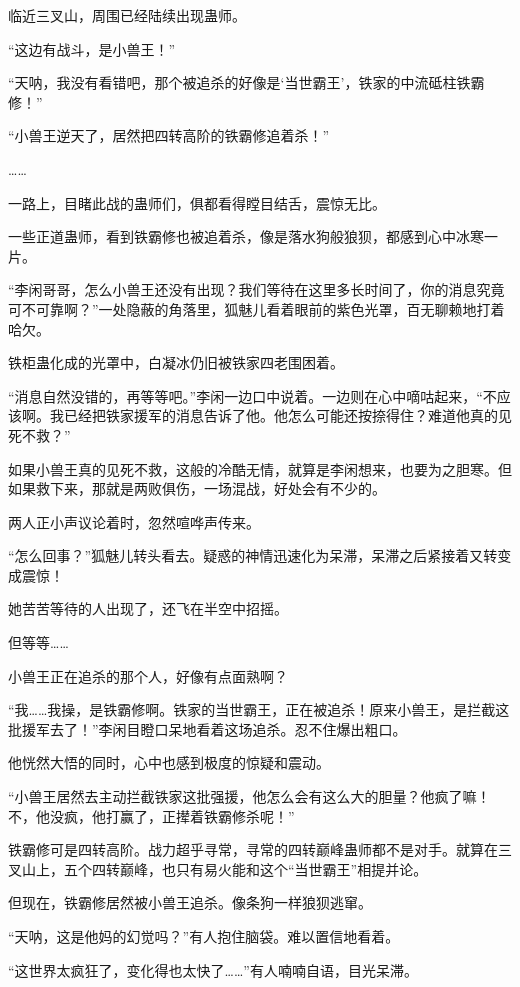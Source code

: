 \begin{this_body}
临近三叉山，周围已经陆续出现蛊师。

“这边有战斗，是小兽王！”

“天呐，我没有看错吧，那个被追杀的好像是‘当世霸王’，铁家的中流砥柱铁霸修！”

“小兽王逆天了，居然把四转高阶的铁霸修追着杀！”

……

一路上，目睹此战的蛊师们，俱都看得瞠目结舌，震惊无比。

一些正道蛊师，看到铁霸修也被追着杀，像是落水狗般狼狈，都感到心中冰寒一片。

“李闲哥哥，怎么小兽王还没有出现？我们等待在这里多长时间了，你的消息究竟可不可靠啊？”一处隐蔽的角落里，狐魅儿看着眼前的紫色光罩，百无聊赖地打着哈欠。

铁柜蛊化成的光罩中，白凝冰仍旧被铁家四老围困着。

“消息自然没错的，再等等吧。”李闲一边口中说着。一边则在心中嘀咕起来，“不应该啊。我已经把铁家援军的消息告诉了他。他怎么可能还按捺得住？难道他真的见死不救？”

如果小兽王真的见死不救，这般的冷酷无情，就算是李闲想来，也要为之胆寒。但如果救下来，那就是两败俱伤，一场混战，好处会有不少的。

两人正小声议论着时，忽然喧哗声传来。

“怎么回事？”狐魅儿转头看去。疑惑的神情迅速化为呆滞，呆滞之后紧接着又转变成震惊！

她苦苦等待的人出现了，还飞在半空中招摇。

但等等……

小兽王正在追杀的那个人，好像有点面熟啊？

“我……我操，是铁霸修啊。铁家的当世霸王，正在被追杀！原来小兽王，是拦截这批援军去了！”李闲目瞪口呆地看着这场追杀。忍不住爆出粗口。

他恍然大悟的同时，心中也感到极度的惊疑和震动。

“小兽王居然去主动拦截铁家这批强援，他怎么会有这么大的胆量？他疯了嘛！不，他没疯，他打赢了，正撵着铁霸修杀呢！”

铁霸修可是四转高阶。战力超乎寻常，寻常的四转巅峰蛊师都不是对手。就算在三叉山上，五个四转巅峰，也只有易火能和这个“当世霸王”相提并论。

但现在，铁霸修居然被小兽王追杀。像条狗一样狼狈逃窜。

“天呐，这是他妈的幻觉吗？”有人抱住脑袋。难以置信地看着。

“这世界太疯狂了，变化得也太快了……”有人喃喃自语，目光呆滞。


\end{this_body}

